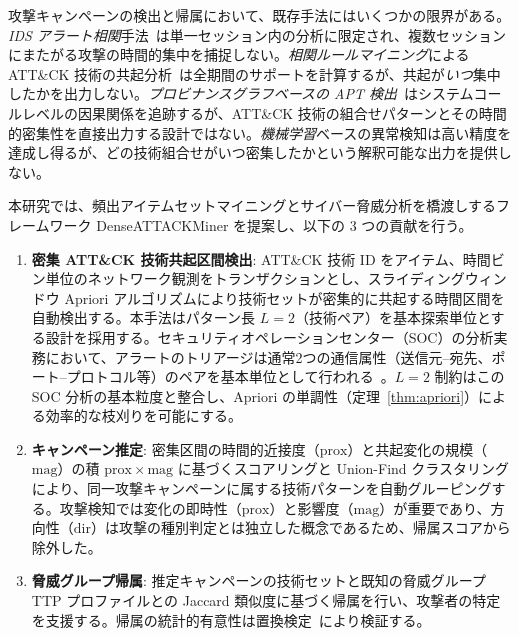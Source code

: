 \documentclass[11pt]{article}
\begin{document}
攻撃キャンペーンの検出と帰属において、既存手法にはいくつかの限界がある。\emph{IDS アラート相関}手法~\cite{ning2004techniques,ahmadinejad2009mining}は単一セッション内の分析に限定され、複数セッションにまたがる攻撃の時間的集中を捕捉しない。\emph{相関ルールマイニング}による ATT\&CK 技術の共起分析~\cite{alshaer2020learning}は全期間のサポートを計算するが、共起が\emph{いつ}集中したかを出力しない。\emph{プロビナンスグラフベースの APT 検出}~\cite{milajerdi2019holmes,hossain2017sleuth,han2020unicorn}はシステムコールレベルの因果関係を追跡するが、ATT\&CK 技術の組合せパターンとその時間的密集性を直接出力する設計ではない。\emph{機械学習}ベースの異常検知は高い精度を達成し得るが、どの技術組合せがいつ密集したかという解釈可能な出力を提供しない。

本研究では、頻出アイテムセットマイニングとサイバー脅威分析を橋渡しするフレームワーク DenseATTACKMiner を提案し、以下の 3 つの貢献を行う。

\begin{enumerate}
    \item \textbf{密集 ATT\&CK 技術共起区間検出}: ATT\&CK 技術 ID をアイテム、時間ビン単位のネットワーク観測をトランザクションとし、スライディングウィンドウ Apriori アルゴリズムにより技術セットが密集的に共起する時間区間を自動検出する。本手法はパターン長 $L=2$（技術ペア）を基本探索単位とする設計を採用する。セキュリティオペレーションセンター（SOC）の分析実務において、アラートのトリアージは通常2つの通信属性（送信元--宛先、ポート--プロトコル等）のペアを基本単位として行われる~\cite{julisch2003clustering}。$L=2$ 制約はこの SOC 分析の基本粒度と整合し、Apriori の単調性（定理~\ref{thm:apriori}）による効率的な枝刈りを可能にする。

    \item \textbf{キャンペーン推定}: 密集区間の時間的近接度（$\mathrm{prox}$）と共起変化の規模（$\mathrm{mag}$）の積 $\mathrm{prox} \times \mathrm{mag}$ に基づくスコアリングと Union-Find クラスタリングにより、同一攻撃キャンペーンに属する技術パターンを自動グルーピングする。攻撃検知では変化の即時性（$\mathrm{prox}$）と影響度（$\mathrm{mag}$）が重要であり、方向性（$\mathrm{dir}$）は攻撃の種別判定とは独立した概念であるため、帰属スコアから除外した。

    \item \textbf{脅威グループ帰属}: 推定キャンペーンの技術セットと既知の脅威グループ TTP プロファイルとの Jaccard 類似度に基づく帰属を行い、攻撃者の特定を支援する。帰属の統計的有意性は置換検定~\cite{lancaster2018surrogate}により検証する。
\end{enumerate}
\end{document}
